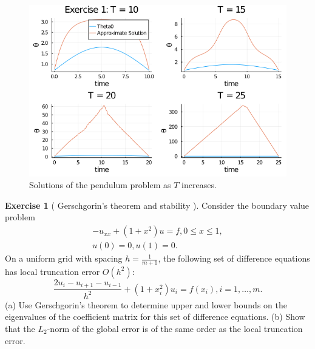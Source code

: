 \documentclass[12pt]{article}
\theoremstyle{definition}
\newtheorem{exer}{Exercise}
\theoremstyle{remark}
\begin{document}
\begin{figure}[h]
    \centering
    \includegraphics[width=0.8\linewidth]{figs/hw-3-max-theta.png}
    \caption{Solutions of the pendulum problem as $T$ increases.}
    \label{fig:figs/hw-3-max-theta}
\end{figure}

\newpage

\begin{exer}[ Gerschgorin’s theorem and stability ]
    Consider the boundary value problem
    \begin{align*}
        - u_{xx} + (1 + x^{2}) u = f, 0\leq x \leq 1,\\
        u(0) = 0, u(1) = 0.
    \end{align*}
    On a uniform grid with spacing $h = \frac{1}{m+1}$, the following set of difference equations has local truncation error $O(h^{2})$:
    \begin{equation*}
        \frac{2 u_{i} - u_{i+1} - u_{i-1}}{h^{2}} + (1 + x_{i}^{2})u_{i} = f(x_{i}), i = 1, \ldots, m.
    \end{equation*}
    (a) Use Gerschgorin's theorem to determine upper and lower bounds on the eigenvalues of the coefficient matrix for this set of difference equations.
    (b) Show that the $L_{2}$-norm of the global error is of the same order as the local truncation error.
\end{exer}
\end{document}
